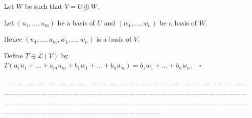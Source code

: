 \documentclass[a4paper, 11pt, UTF8]{article}
\def\Lm{\mathcal{L}}
\begin{document}
\begin{large}
Let $W$ be such that $V=U\oplus W.$\par\quad
Let $(u_1,\dots,u_m)$ be a basis of $U$ and $(w_1,\dots,w_n)$ be a basis of $W.$\par\quad
Hence $(u_1,\dots,u_m,w_1,\dots,w_n)$ is a basis of $V$.\par\quad
Define $T\in\Lm(V)$ by $T(a_1 u_1+\dots+a_m u_m+b_1 w_1+\dots+b_n w_n)=b_1 w_1+\dots+b_n w_n.\quad\square$\par
{\tiny \_\,\_\,\_\,\_\,\_\,\_\,\_\,\_\,\_\,\_\,\_\,\_\,\_\,\_\,\_\,\_\,\_\,\_\,\_\,\_\,\_\,\_\,\_\,\_\,\_\,\_\,\_\,\_\,\_\,\_\,\_\,\_\,\_\,\_\,\_\,\_\,\_\,\_\,\_\,\_\,\_\,\_\,\_\,\_\,\_\,\_\,\_\,\_\,\_\,\_\,\_\,\_\,\_\,\_\,\_\,\_\,\_\,\_\,\_\,\_\,\_\,\_\,\_\,\_\,\_\,\_\,\_\,\_\,\_\,\_\,\_\_\,\_\,\_\,\_\,\_\,\_\,\_\,\_\,\_\,\_\,\_\,\_\,\_\,\_\,\_\,\_\,\_\,\_\,\_\,\_\,\_\,\_\,\_\,\_\,\_\,\_\,\_\,\_\,\_\,\_\,\_\,\_\,\_\,\_\,\_\,\_\,\_\,\_\,\_\,\_\,\_\,\_\,\_\,\_\,\_\,\_\,\_\,\_\,\_\,\_\,\_\,\_\,\_\,\_\,\_\,\_\,\_\,\_\,\_\,\_\,\_\,\_\,\_\,\_\,\_\,\_\,\_\,\_\,\_\,\_\,\_}\par


\end{large}
\end{document}
